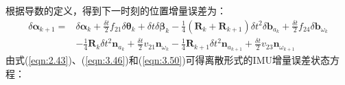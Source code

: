 根据导数的定义，得到下一时刻的位置增量误差为：
\begin{equation}
\label{eqn:3.50}
\begin{aligned}
\delta \bm{\alpha}_{k+1} =& \delta \bm{\alpha}_{k}+\frac{\delta t}{2} f_{21} \delta \bm{\theta}_{k}+\delta t \delta \bm{\beta}_{k}-\frac{1}{4}\left( \mathbf{R}_{k}+\mathbf{R}_{k+1}\right) \delta t^{2} \delta \mathbf{b}_{a_{k}}+\frac{\delta t}{2} f_{24} \delta \mathbf{b}_{\omega_{k}} \\
& -\frac{1}{4} \mathbf{R}_{k} \delta t^{2} \mathbf{n}_{a_{k}} +\frac{\delta t}{2} v_{21} \mathbf{n}_{\omega_{k}}-\frac{1}{4} \mathbf{R}_{k+1} \delta t^{2} \mathbf{n}_{a_{k+1}}+\frac{\delta t}{2} v_{23} \mathbf{n}_{\omega_{k+1}}
\end{aligned}
\end{equation}
由式(\ref{eqn:2.43})、(\ref{eqn:3.46})和(\ref{eqn:3.50})可得离散形式的IMU增量误差状态方程：
